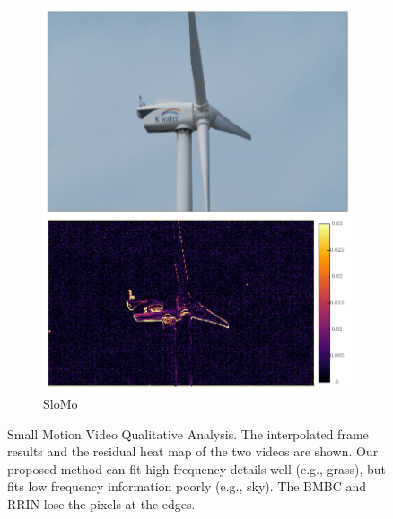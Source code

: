 \documentclass{article}
\begin{document}
\begin{figure}[h]
\begin{subfigure}{0.14\textwidth}
    \includegraphics[width=1\linewidth]{qua_imgs/TEST02_045_f0465_super.jpg}
    \caption{SloMo}
\end{subfigure}
\caption{Small Motion Video Qualitative Analysis. The interpolated frame results and the residual heat map of the two videos are shown. Our proposed method can fit high frequency details well (e.g., grass), but fits low frequency information poorly (e.g., sky). The BMBC and RRIN lose the pixels at the edges.}
\end{figure}
\end{document}
